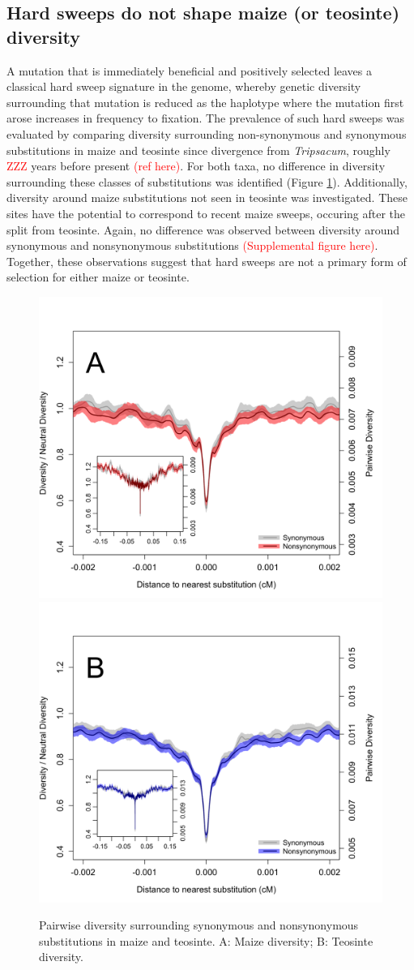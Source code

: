 \documentclass{pnastwo}
\begin{document}
\begin{article}
\subsection{Hard sweeps do not shape maize (or teosinte) diversity}
A mutation that is immediately beneficial and positively selected leaves a classical hard
sweep signature in the genome, whereby genetic diversity surrounding
that mutation is reduced as the haplotype where the mutation first
arose increases in frequency to fixation. The prevalence of such hard
sweeps was evaluated by comparing diversity
surrounding non-synonymous and synonymous substitutions in maize and
teosinte since divergence from \emph{Tripsacum}, roughly \textcolor{red}{ZZZ} years before
present \textcolor{red}{(ref here)}. For both taxa, no difference in diversity
surrounding these classes of substitutions was identified (Figure
\ref{hardSweeps}). Additionally, diversity around maize substitutions
not seen in teosinte was investigated. These sites have the potential
to correspond to recent maize sweeps, occuring after the split from
teosinte. Again, no difference was observed between diversity around
synonymous and nonsynonymous substitutions
\textcolor{red}{(Supplemental figure here)}. Together, these
observations suggest that hard sweeps are not a primary form of
selection for either maize or teosinte.

\begin{figure}[b]
\centering
\includegraphics[width=.45\textwidth]{FigsAndFiles/plotDiversity_TvM_Folded2_Significance_June}
\hspace{0.05\textwidth} \includegraphics[width=.45\textwidth]{FigsAndFiles/plotDiversity_TvT_Folded2_Significance_June}
\caption{Pairwise diversity surrounding synonymous and nonsynonymous
  substitutions in maize and teosinte. A: Maize diversity; B: Teosinte
diversity.}
\label{hardSweeps}
\end{figure}



\end{article}
\end{document}
